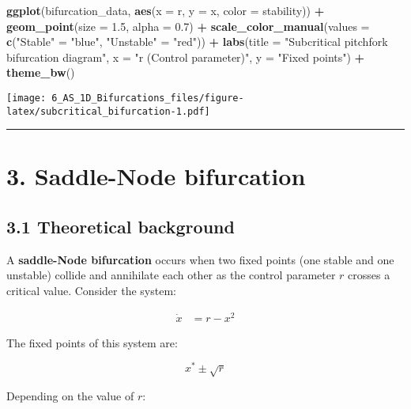 \documentclass[
]{article}
\newenvironment{Shaded}{\begin{snugshade}}{\end{snugshade}}
\newcommand{\AttributeTok}[1]{\textcolor[rgb]{0.13,0.29,0.53}{#1}}
\newcommand{\FloatTok}[1]{\textcolor[rgb]{0.00,0.00,0.81}{#1}}
\newcommand{\FunctionTok}[1]{\textcolor[rgb]{0.13,0.29,0.53}{\textbf{#1}}}
\newcommand{\NormalTok}[1]{#1}
\newcommand{\OtherTok}[1]{\textcolor[rgb]{0.56,0.35,0.01}{#1}}
\newcommand{\SpecialCharTok}[1]{\textcolor[rgb]{0.81,0.36,0.00}{\textbf{#1}}}
\newcommand{\StringTok}[1]{\textcolor[rgb]{0.31,0.60,0.02}{#1}}
\begin{document}
\begin{Shaded}
\begin{Highlighting}[]
\FunctionTok{ggplot}\NormalTok{(bifurcation\_data, }\FunctionTok{aes}\NormalTok{(}\AttributeTok{x =}\NormalTok{ r, }\AttributeTok{y =}\NormalTok{ x, }\AttributeTok{color =}\NormalTok{ stability)) }\SpecialCharTok{+}
  \FunctionTok{geom\_point}\NormalTok{(}\AttributeTok{size =} \FloatTok{1.5}\NormalTok{, }\AttributeTok{alpha =} \FloatTok{0.7}\NormalTok{) }\SpecialCharTok{+}
  \FunctionTok{scale\_color\_manual}\NormalTok{(}\AttributeTok{values =} \FunctionTok{c}\NormalTok{(}\StringTok{"Stable"} \OtherTok{=} \StringTok{"blue"}\NormalTok{, }\StringTok{"Unstable"} \OtherTok{=} \StringTok{"red"}\NormalTok{)) }\SpecialCharTok{+}
  \FunctionTok{labs}\NormalTok{(}\AttributeTok{title =} \StringTok{"Subcritical pitchfork bifurcation diagram"}\NormalTok{, }
       \AttributeTok{x =} \StringTok{"r (Control parameter)"}\NormalTok{, }\AttributeTok{y =} \StringTok{"Fixed points"}\NormalTok{) }\SpecialCharTok{+}
  \FunctionTok{theme\_bw}\NormalTok{()}
\end{Highlighting}
\end{Shaded}

\texttt{[image: 6\_AS\_1D\_Bifurcations\_files/figure-latex/subcritical\_bifurcation-1.pdf]}

\begin{center}\rule{0.5\linewidth}{0.5pt}\end{center}

\section{3. Saddle-Node bifurcation}\label{saddle-node-bifurcation}

\subsection{\texorpdfstring{\textbf{3.1 Theoretical
background}}{3.1 Theoretical background}}\label{theoretical-background-2}

A \textbf{saddle-Node bifurcation} occurs when two fixed points (one
stable and one unstable) collide and annihilate each other as the
control parameter \(r\) crosses a critical value. Consider the system:

\[
\begin{aligned}
\dot{x} &= r  - x^2
\end{aligned}
\]

The fixed points of this system are:

\[
x^*  \pm\sqrt{r}
\]

Depending on the value of \(r\):
\end{document}
